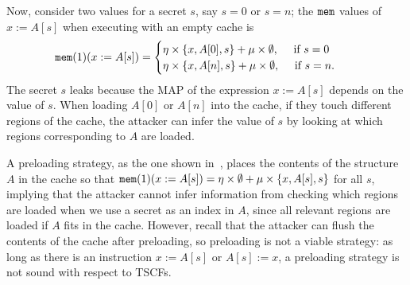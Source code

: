 Now, consider two values for a secret $s$, say $s=0$ or $s=n$; the $\texttt{mem}$ values of $x:=A[s]$ when executing with an empty cache is 
\begin{align*}
    \texttt{mem}(1)(x:=A[s])&=\begin{cases}
        \eta\times\left\{x,A[0],s\right\}+\mu\times\emptyset,\quad \text{   if $s=0$}\\
        \eta\times\left\{x,A[n],s\right\}+\mu\times\emptyset,\quad \text{   if $s=n$}.
    \end{cases}
\end{align*}
The secret $s$ leaks because the MAP of the expression $x:=A[s]$ depends on the value of $s$. When loading $A[0]$ or $A[n]$ into the cache, if they touch different regions of the cache, the attacker can infer the value of $s$ by looking at which regions corresponding to $A$ are loaded. 

A preloading strategy, as the one shown in~\cite{SCEliminator}, places the contents of the structure $A$ in the cache so that $\texttt{mem}(1)(x:=A[s])=\eta\times\emptyset+\mu\times\left\{x,A[s],s\right\}$ for all $s$, implying that the attacker cannot infer information from checking which regions are loaded when we use a secret as an index in $A$, since all relevant regions are loaded if $A$ fits in the cache. However, recall that the attacker can flush the contents of the cache after preloading, so preloading is not a viable strategy: as long as there is an instruction $x:=A[s]$ or $A[s]:=x$, a preloading strategy is not sound with respect to TSCFs.

